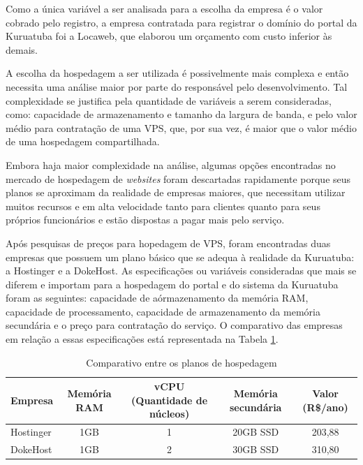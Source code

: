 Como a única variável a ser analisada para a escolha da empresa é o valor cobrado pelo registro, a empresa contratada para registrar o domínio do portal da Kuruatuba foi a Locaweb, que elaborou um orçamento com custo inferior às demais. 

A escolha da hospedagem a ser utilizada é possivelmente mais complexa e então necessita uma análise maior por parte do responsável pelo desenvolvimento. Tal complexidade se justifica pela quantidade de variáveis a serem consideradas, como: capacidade de armazenamento e tamanho da largura de banda, e pelo valor médio para contratação de uma VPS, que, por sua vez, é maior que o valor médio de uma hospedagem compartilhada.

Embora haja maior complexidade na análise, algumas opções encontradas no mercado de hospedagem de \textit{websites} foram descartadas rapidamente porque seus planos se aproximam da realidade de empresas maiores, que necessitam utilizar muitos recursos e em alta velocidade tanto para clientes quanto para seus próprios funcionários e estão dispostas a pagar mais pelo serviço. 

Após pesquisas de preços para hopedagem de VPS, foram encontradas duas empresas que possuem um plano básico que se adequa à realidade da Kuruatuba: a Hostinger e a DokeHost. As especificações ou variáveis consideradas que mais se diferem e importam para a hospedagem do portal e do sistema da Kuruatuba foram as seguintes: capacidade de aórmazenamento da memória RAM, capacidade de processamento, capacidade de armazenamento da memória secundária e o preço para contratação do serviço. O comparativo das empresas em relação a essas especificações está representada na Tabela \ref{comparativo-hospedagem}.

\newpage

\begin{table}[h]
\centering
{}
\caption{Comparativo entre os planos de hospedagem}
\vspace{0.5cm}

\setlength{\extrarowheight}{0.15cm}
\begin{tabular}{l|c|c|c|c}
 
\textbf{Empresa} & \textbf{Memória RAM} & \textbf{vCPU (Quantidade de núcleos)} & \textbf{Memória secundária} & \textbf{Valor (R\$/ano)} \\ %
\hline                               %
Hostinger & 1GB & 1 & 20GB SSD & 203,88 \\
DokeHost & 1GB & 2 & 30GB SSD & 310,80  \\ 

\hline   
\end{tabular}
\label{comparativo-hospedagem}
\end{table}

